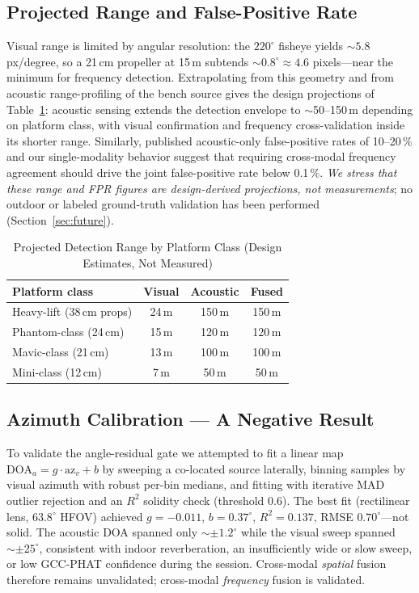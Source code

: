 \documentclass[conference]{IEEEtran}
\begin{document}
\subsection{Projected Range and False-Positive Rate}
\label{sec:projections}
Visual range is limited by angular resolution: the $220^{\circ}$ fisheye
yields ${\sim}5.8$\,px/degree, so a 21\,cm propeller at 15\,m subtends
${\sim}0.8^{\circ} \approx 4.6$ pixels---near the minimum for frequency
detection. Extrapolating from this geometry and from acoustic
range-profiling of the bench source gives the design projections of
Table~\ref{tab:range}: acoustic sensing extends the detection envelope
to ${\sim}$50--150\,m depending on platform class, with visual
confirmation and frequency cross-validation inside its shorter range.
Similarly, published acoustic-only false-positive rates of 10--20\,\%
and our single-modality behavior suggest that requiring cross-modal
frequency agreement should drive the joint false-positive rate below
0.1\,\%. \emph{We stress that these range and FPR figures are
design-derived projections, not measurements}; no outdoor or labeled
ground-truth validation has been performed (Section~\ref{sec:future}).

\begin{table}[t]
\caption{Projected Detection Range by Platform Class (Design
Estimates, Not Measured)}
\label{tab:range}
\centering
\begin{tabular}{@{}lccc@{}}
\toprule
\textbf{Platform class} & \textbf{Visual} & \textbf{Acoustic} & \textbf{Fused} \\
\midrule
Heavy-lift (38\,cm props) & 24\,m & 150\,m & 150\,m \\
Phantom-class (24\,cm) & 15\,m & 120\,m & 120\,m \\
Mavic-class (21\,cm) & 13\,m & 100\,m & 100\,m \\
Mini-class (12\,cm) & 7\,m & 50\,m & 50\,m \\
\bottomrule
\end{tabular}
\end{table}

\subsection{Azimuth Calibration --- A Negative Result}
\label{sec:azimuth}
To validate the angle-residual gate we attempted to fit a linear map
$\mathrm{DOA}_a = g \cdot \mathrm{az}_v + b$ by sweeping a co-located
source laterally, binning samples by visual azimuth with robust per-bin
medians, and fitting with iterative MAD outlier rejection and an $R^2$
solidity check (threshold 0.6). The best fit (rectilinear lens,
$63.8^{\circ}$ HFOV) achieved $g = -0.011$, $b = 0.37^{\circ}$,
$R^2 = 0.137$, RMSE $0.70^{\circ}$---not solid. The acoustic DOA spanned
only ${\sim}\pm 1.2^{\circ}$ while the visual sweep spanned
${\sim}\pm 25^{\circ}$, consistent with indoor reverberation, an
insufficiently wide or slow sweep, or low GCC-PHAT confidence during the
session. Cross-modal \emph{spatial} fusion therefore remains unvalidated;
cross-modal \emph{frequency} fusion is validated.
\end{document}
